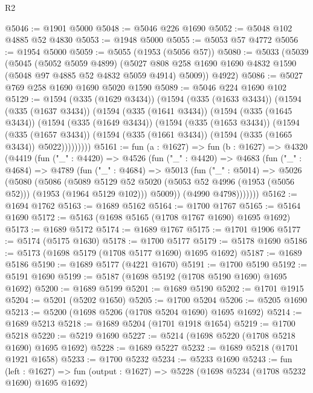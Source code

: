 \begin{lexlean}{R2}
\begin{coremodule}
@5046 := @1901 @5000
@5048 := @5046 @226 @1690
@5052 := @5048 @102 @4885 @52 @4830
@5053 := @1948 @5000
@5055 := @5053 @57 @4772
@5056 := @1954 @5000
@5059 := @5055 (@1953 (@5056 @57))
@5080 := @5033
    (@5039
      (@5045
        (@5052 @5059 @4899)
        (@5027 @808 @258 @1690 @1690 @4832 @1590 (@5048 @97 @4885 @52 @4832 @5059 @4914) @5009))
      @4922)
@5086 := @5027 @769 @258 @1690 @1690 @5020 @1590
@5089 := @5046 @224 @1690 @102
@5129 := @1594
    (@335 (@1629 @3434))
    (@1594
      (@335 (@1633 @3434))
      (@1594
        (@335 (@1637 @3434))
        (@1594
          (@335 (@1641 @3434))
          (@1594
            (@335 (@1645 @3434))
            (@1594
              (@335 (@1649 @3434))
              (@1594
                (@335 (@1653 @3434))
                (@1594
                  (@335 (@1657 @3434))
                  (@1594 (@335 (@1661 @3434)) (@1594 (@335 (@1665 @3434)) @5022)))))))))
@5161 := fun (a : @1627) =>
  fun (b : @1627) =>
  @4320
    (@4419
      (fun ("_" : @4420) =>
      @4526
        (fun ("_" : @4420) =>
        @4683
          (fun ("_" : @4684) =>
          @4789
            (fun ("_" : @4684) =>
            @5013
              (fun ("_" : @5014) =>
              @5026
                (@5080
                  (@5086
                    (@5089
                      @5129
                      @52
                      @5020
                      (@5053 @52 @4996 (@1953 (@5056 @52)))
                      (@1953 (@1964 @5129 @102)))
                    @5009))
                (@4990 @4798)))))))
@5162 := @1694 @1762
@5163 := @1689 @5162
@5164 := @1700 @1767
@5165 := @5164 @1690
@5172 := @5163 (@1698 @5165 (@1708 @1767 @1690) @1695 @1692)
@5173 := @1689 @5172
@5174 := @1689 @1767
@5175 := @1701 @1906
@5177 := @5174 (@5175 @1630)
@5178 := @1700 @5177
@5179 := @5178 @1690
@5186 := @5173 (@1698 @5179 (@1708 @5177 @1690) @1695 @1692)
@5187 := @1689 @5186
@5190 := @1689 @5177 (@4221 @1670)
@5191 := @1700 @5190
@5192 := @5191 @1690
@5199 := @5187 (@1698 @5192 (@1708 @5190 @1690) @1695 @1692)
@5200 := @1689 @5199
@5201 := @1689 @5190
@5202 := @1701 @1915
@5204 := @5201 (@5202 @1650)
@5205 := @1700 @5204
@5206 := @5205 @1690
@5213 := @5200 (@1698 @5206 (@1708 @5204 @1690) @1695 @1692)
@5214 := @1689 @5213
@5218 := @1689 @5204 (@1701 @1918 @1654)
@5219 := @1700 @5218
@5220 := @5219 @1690
@5227 := @5214 (@1698 @5220 (@1708 @5218 @1690) @1695 @1692)
@5228 := @1689 @5227
@5232 := @1689 @5218 (@1701 @1921 @1658)
@5233 := @1700 @5232
@5234 := @5233 @1690
@5243 := fun (left : @1627) =>
  fun (output : @1627) => @5228 (@1698 @5234 (@1708 @5232 @1690) @1695 @1692)

\end{coremodule}
\end{lexlean}
